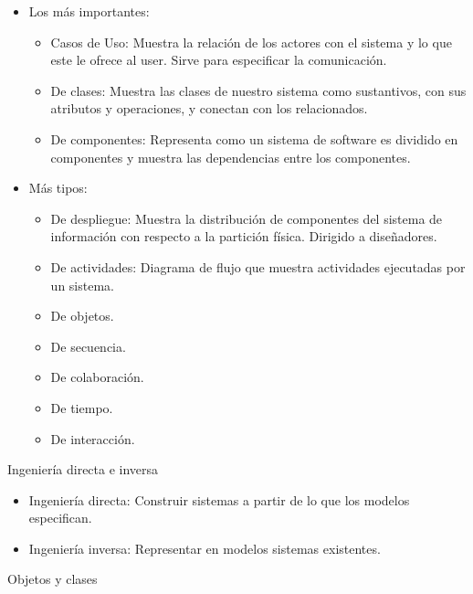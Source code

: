 \documentclass[12pt, twoside, openright]{report} %
\begin{document}
\begin{itemize}
	\item Los más importantes:

	      \begin{itemize}
		      \item Casos de Uso: Muestra la relación de los actores con el sistema
		            y lo que este le ofrece al user. Sirve para especificar la
		            comunicación.
		      \item De clases: Muestra las clases de nuestro sistema como
		            sustantivos, con sus atributos y operaciones, y conectan con los
		            relacionados.
		      \item De componentes: Representa como un sistema de software es
		            dividido en componentes y muestra las dependencias entre los
		            componentes.
	      \end{itemize}
	\item Más tipos:

	      \begin{itemize}
		      \item De despliegue: Muestra la distribución de componentes del
		            sistema de información con respecto a la partición física.
		            Dirigido a diseñadores.
		      \item De actividades: Diagrama de flujo que muestra actividades
		            ejecutadas por un sistema.
		      \item De objetos.
		      \item De secuencia.
		      \item De colaboración.
		      \item De tiempo.
		      \item De interacción.
	      \end{itemize}
\end{itemize}

Ingeniería directa e inversa
\vspace{-0.5cm}
\begin{itemize}
	\item Ingeniería directa: Construir sistemas a partir de lo que los
	      modelos especifican.
	\item Ingeniería inversa: Representar en modelos sistemas existentes.
\end{itemize}

Objetos y clases
\vspace{-0.5cm}
\end{document}
